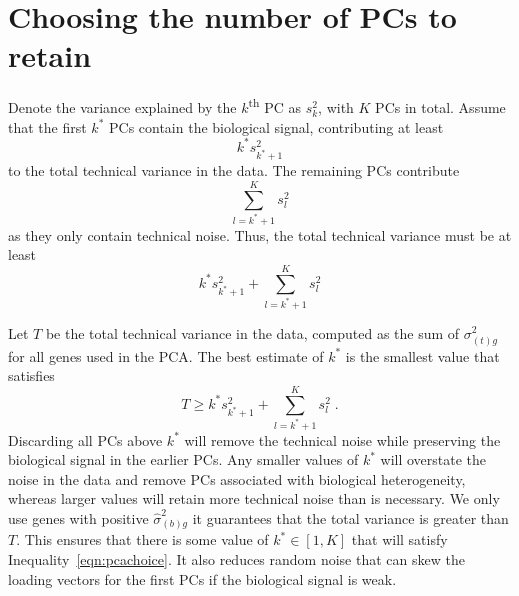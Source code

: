 \documentclass{article}
\begin{document}
\section{Choosing the number of PCs to retain}
Denote the variance explained by the $k$\textsuperscript{th} PC as $s^2_k$, with $K$ PCs in total.
Assume that the first $k^*$ PCs contain the biological signal, contributing at least
\[
    k^* s^2_{k^*+1}
\]
to the total technical variance in the data. 
The remaining PCs contribute
\[
    \sum_{l=k^*+1}^K s^2_l 
\]
as they only contain technical noise.
Thus, the total technical variance must be at least
\[
    k^* s^2_{k^*+1} + \sum_{l=k^*+1}^K s^2_l 
\]

Let $T$ be the total technical variance in the data, computed as the sum of $\sigma^2_{(t)g}$ for all genes used in the PCA.
The best estimate of $k^*$ is the smallest value that satisfies 
\begin{equation}
    T \ge k^* s^2_{k^*+1} + \sum_{l=k^*+1}^K s^2_l  \label{eqn:pcachoice} \;.
\end{equation}
Discarding all PCs above $k^*$ will remove the technical noise while preserving the biological signal in the earlier PCs.
Any smaller values of $k^*$ will overstate the noise in the data and remove PCs associated with biological heterogeneity,
whereas larger values will retain more technical noise than is necessary. 
We only use genes with positive $\hat\sigma^2_{(b)g}$ it guarantees that the total variance is greater than $T$.
This ensures that there is some value of $k^* \in [1, K]$ that will satisfy Inequality~\ref{eqn:pcachoice}.
It also reduces random noise that can skew the loading vectors for the first PCs if the biological signal is weak.
\end{document}
